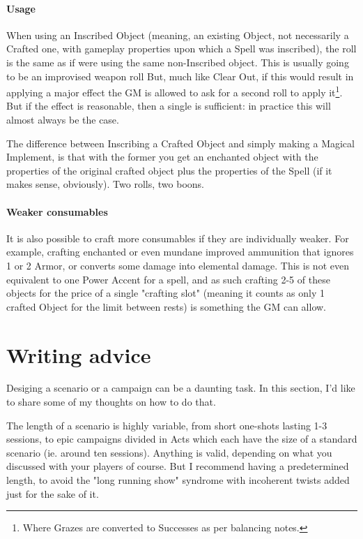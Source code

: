 \paragraph{Usage}

When using an Inscribed Object (meaning, an existing Object, not necessarily a Crafted one, with gameplay properties upon which a Spell was inscribed), the roll is the same as if were using the same non-Inscribed object. This is usually going to be an improvised weapon roll But, much like Clear Out, if this would result in applying a major effect the GM is allowed to ask for a second roll to apply it\footnote{Where Grazes are converted to Successes as per balancing notes.}. But if the effect is reasonable, then a single is sufficient: in practice this will almost always be the case.

The difference between Inscribing a Crafted Object and simply making a Magical Implement, is that with the former you get an enchanted object with the properties of the original crafted object plus the properties of the Spell (if it makes sense, obviously). Two rolls, two boons.


\paragraph{Weaker consumables}

\label{weaker_consumables}

It is also possible to craft more consumables if they are individually weaker. For example, crafting enchanted or even mundane improved ammunition that ignores 1 or 2 Armor, or converts some damage into elemental damage. This is not even equivalent to one Power Accent for a spell, and as such crafting 2-5 of these objects for the price of a single "crafting slot" (meaning it counts as only 1 crafted Object for the limit between rests) is something the GM can allow.

\section{Writing advice}

Desiging a scenario or a campaign can be a daunting task. In this section, I'd like to share some of my thoughts on how to do that.

The length of a scenario is highly variable, from short one-shots lasting 1-3 sessions, to epic campaigns divided in Acts which each have the size of a standard scenario (ie. around ten sessions). Anything is valid, depending on what you discussed with your players of course. But I recommend having a predetermined length, to avoid the "long running show" syndrome with incoherent twists added just for the sake of it.

